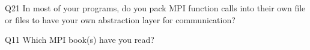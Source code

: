 \begin{description}%
\item{Q21} In most of your programs, do you pack MPI function calls into their own file or files to have your own abstraction layer for communication?%
\item{Q11} Which MPI book(s) have you read?%
\end{description}%
